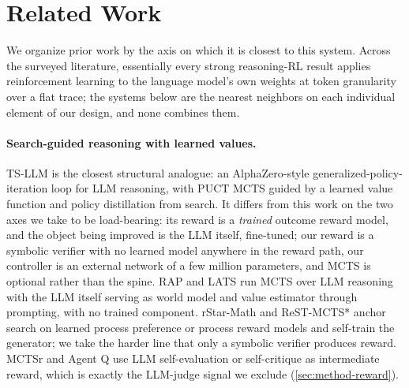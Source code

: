 \section{Related Work}
\label{sec:related}

We organize prior work by the axis on which it is closest to this system.
Across the surveyed literature, essentially every strong reasoning-RL result
applies reinforcement learning to the language model's own weights at token
granularity over a flat trace; the systems below are the nearest neighbors
on each individual element of our design, and none combines them.

\paragraph{Search-guided reasoning with learned values.}
TS-LLM \citep{tsllm} is the closest structural analogue: an
AlphaZero-style \citep{alphazero} generalized-policy-iteration loop for LLM
reasoning, with PUCT MCTS guided by a learned value function and policy
distillation from search. It differs from this work on the two axes we take
to be load-bearing: its reward is a \emph{trained} outcome reward model, and
the object being improved is the LLM itself, fine-tuned; our reward is a
symbolic verifier with no learned model anywhere in the reward path, our
controller is an external network of a few million parameters, and MCTS is
optional rather than the spine. RAP \citep{rap} and LATS \citep{lats} run
MCTS over LLM reasoning with the LLM itself serving as world model and value
estimator through prompting, with no trained component. rStar-Math
\citep{rstarmath} and ReST-MCTS* \citep{restmcts} anchor search on learned
process preference or process reward models and self-train the generator;
we take the harder line that only a symbolic verifier produces reward.
MCTSr \citep{mctsr} and Agent Q \citep{agentq} use LLM self-evaluation or
self-critique as intermediate reward, which is exactly the LLM-judge signal
we exclude (\cref{sec:method-reward}).

